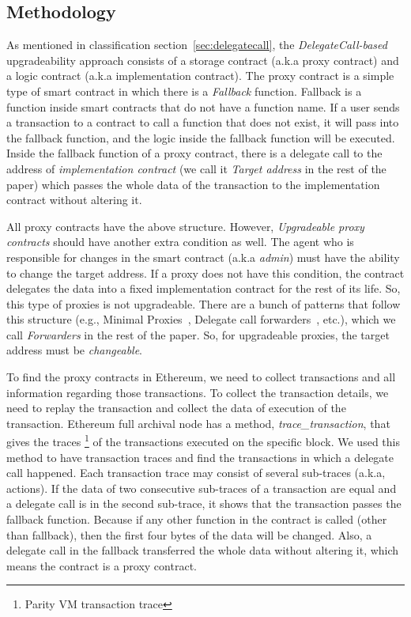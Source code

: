 \subsection{Methodology} 
As mentioned in classification section~\ref{sec:delegatecall}, the \textit{DelegateCall-based} upgradeability approach consists of a storage contract (a.k.a proxy contract) and a logic contract (a.k.a implementation contract). 
The proxy contract is a simple type of smart contract in which there is a \textit{Fallback} function. Fallback is a function inside smart contracts that do not have a function name. If a user sends a transaction to a contract to call a function that does not exist, it will pass into the fallback function, and the logic inside the fallback function will be executed. Inside the fallback function of a proxy contract, there is a delegate call to the address of \textit{implementation contract} (we call it \emph{Target address} in the rest of the paper) which passes the whole data of the transaction to the implementation contract without altering it.

All proxy contracts have the above structure. However, \textit{Upgradeable proxy contracts} should have another extra condition as well. The agent who is responsible for changes in the smart contract (a.k.a \emph{admin}) must have the ability to change the target address. If a proxy does not have this condition, the contract delegates the data into a fixed implementation contract for the rest of its life. So, this type of proxies is not upgradeable. There are a bunch of patterns that follow this structure (e.g., Minimal Proxies~\cite{minimalProxy}, Delegate call forwarders~\cite{delegatecallForwarders}, etc.), which we call \textit{Forwarders} in the rest of the paper. So, for upgradeable proxies, the target address must be \emph{changeable}.

To find the proxy contracts in Ethereum, we need to collect transactions and all information regarding those transactions. To collect the transaction details, we need to replay the transaction and collect the data of execution of the transaction. Ethereum full archival node has a method, \textit{trace\_transaction}, that gives the traces \footnote{Parity VM transaction trace} of the transactions executed on the specific block. We used this method to have transaction traces and find the transactions in which a delegate call happened. Each transaction trace may consist of several sub-traces (a.k.a, actions).
If the data of two consecutive sub-traces of a transaction are equal and a delegate call is in the second sub-trace, it shows that the transaction passes the fallback function. Because if any other function in the contract is called (other than fallback), then the first four bytes of the data will be changed. Also, a delegate call in the fallback transferred the whole data without altering it, which means the contract is a proxy contract.

